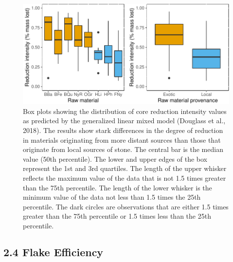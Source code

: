\documentclass[]{elsarticle} %
\begin{document}
\begin{figure}
\centering
\includegraphics{Kanjera_South_Manuscript_files/figure-latex/fig-3-1.pdf}
\caption{Box plots showing the distribution of core reduction intensity
values as predicted by the generalized linear mixed model
(\hspace{0pt}Douglass et al., 2018\hspace{0pt}). The results show stark
differences in the degree of reduction in materials originating from
more distant sources than those that originate from local sources of
stone. The central bar is the median value (50th percentile). The lower
and upper edges of the box represent the 1st and 3rd quartiles. The
length of the upper whisker reflects the maximum value of the data that
is not 1.5 times greater than the 75th percentile. The length of the
lower whisker is the minimum value of the data not less than 1.5 times
the 25th percentile. The dark circles are observations that are either
1.5 times greater than the 75th percentile or 1.5 times less than the
25th percentile. \label{core_redux_rm}}
\end{figure}

\hypertarget{flake-efficiency}{%
\subsection{2.4 Flake Efficiency}\label{flake-efficiency}}
\end{document}
